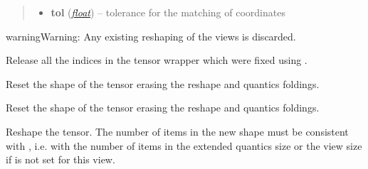 \documentclass[a4paper,10pt,english]{sphinxmanual}
\begin{document}
\begin{fulllineitems}
\begin{fulllineitems}
\begin{quote}
\begin{description}
\begin{itemize}
\item {} 
\textbf{tol} (\href{http://docs.python.org/library/functions.html\#float}{\emph{float}}) -- tolerance for the matching of coordinates

\end{itemize}

\end{description}\end{quote}

\begin{notice}{warning}{Warning:}
Any existing reshaping of the views is discarded.
\end{notice}

\end{fulllineitems}


\begin{fulllineitems}
\label{api-tw:TensorToolbox.core.TensorWrapper.release_indices}
Release all the indices in the tensor wrapper which were fixed using .

\end{fulllineitems}


\begin{fulllineitems}
\label{api-tw:TensorToolbox.core.TensorWrapper.reset_ghost_shape}
Reset the shape of the tensor erasing the reshape and quantics foldings.

\end{fulllineitems}


\begin{fulllineitems}
\label{api-tw:TensorToolbox.core.TensorWrapper.reset_shape}
Reset the shape of the tensor erasing the reshape and quantics foldings.

\end{fulllineitems}


\begin{fulllineitems}
\label{api-tw:TensorToolbox.core.TensorWrapper.reshape}
Reshape the tensor. The number of items in the new shape must be consistent with , i.e. with the number of items in the extended quantics size or the view size if  is not set for this view.


\end{fulllineitems}
\end{fulllineitems}
\end{document}

